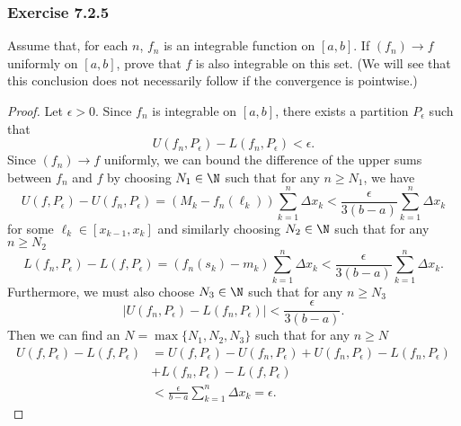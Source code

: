 \subsubsection{Exercise 7.2.5} Assume that, for each \( n  \), \( f_{n} \) is an integrable function on \( [a,b]  \). If \( (f_n) \to f  \) uniformly on \( [a,b]   \), prove that \( f  \) is also integrable on this set. (We will see that this conclusion does not necessarily follow if the convergence is pointwise.)
\begin{proof}
	Let \( \epsilon > 0  \). Since \( f_{n} \) is integrable on \( [a,b]  \), there exists a partition \( P_{\epsilon } \) such that 
	\[ U(f_{n}, P_{\epsilon }) - L(f_{n}, P_{\epsilon }) < \epsilon. \]
	Since \( (f_{n}) \to f  \) uniformly, we can bound the difference of the upper sums between \( f_{n} \) and \( f  \) by choosing \( N_{1} \in \N  \) such that for any \( n \geq N_{1}  \), we have
	\[  U(f, P_{\epsilon }) - U(f_{n}, P_{\epsilon }) = (M_{k} - f_{n}(\ell_k)) \sum_{ k=1 }^{ n } \Delta x_{k } < \frac{ \epsilon  }{  3(b -a)  } \sum_{ k=1 }^{ n } \Delta x_{ k }  \] for some \( \ell_{k } \in [x_{k-1}, x_{k }] \) and similarly choosing \( N_{2} \in \N  \) such that for any \( n \geq N_{2} \)
	\[  L(f_n, P_{\epsilon }) - L(f, P_{\epsilon }) = ( f_{n}(s_{k }) - m_{k}) \sum_{ k=1 }^{ n } \Delta x_{k } < \frac{ \epsilon  }{  3(b -a)  } \sum_{ k=1 }^{ n } \Delta x_{ k }.\] Furthermore, we must also choose \( N_{3} \in \N  \) such that for any \( n \geq N_{3} \) 
	\[  | U(f_{n}, P_{\epsilon }) - L(f_{n}, P_{\epsilon }) | < \frac{ \epsilon  }{ 3 (b-a) } . \]
	Then we can find an \( N = \max \{ N_{1}, N_{2}, N_{3} \}   \) such that for any \( n \geq N  \)
	\begin{align*}
		U(f, P_{\epsilon }) - L(f, P_{\epsilon }) &= U(f, P_{\epsilon }) - U(f_n, P_{\epsilon }) + U(f_{n}, P_{\epsilon }) - L(f_{n}, P_{\epsilon }) \\ 
												  &+ L(f_{n}, P_{\epsilon }) - L(f, P_{\epsilon }) \\
												  &< \frac{ \epsilon  }{ b - a  } \sum_{ k=1 }^{ n } \Delta x_{k} = \epsilon.
	\end{align*}
\end{proof}


